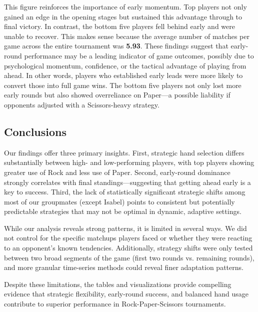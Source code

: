 \documentclass[12pt]{article}
\begin{document}
This figure reinforces the importance of early momentum. Top players not only gained an edge in the opening stages but sustained this advantage through to final victory. In contrast, the bottom five players fell behind early and were unable to recover. This makes sense because the average number of matches per game across the entire tournament was \textbf{5.93}. These findings suggest that early-round performance may be a leading indicator of game outcomes, possibly due to psychological momentum, confidence, or the tactical advantage of playing from ahead. In other words, players who established early leads were more likely to convert those into full game wins. The bottom five players not only lost more early rounds but also showed overreliance on Paper—a possible liability if opponents adjusted with a Scissors-heavy strategy.

\subsection*{Conclusions}

Our findings offer three primary insights. First, strategic hand selection differs substantially between high- and low-performing players, with top players showing greater use of Rock and less use of Paper. Second, early-round dominance strongly correlates with final standings—suggesting that getting ahead early is a key to success. Third, the lack of statistically significant strategic shifts among most of our groupmates (except Isabel) points to consistent but potentially predictable strategies that may not be optimal in dynamic, adaptive settings.

While our analysis reveals strong patterns, it is limited in several ways. We did not control for the specific matchups players faced or whether they were reacting to an opponent’s known tendencies. Additionally, strategy shifts were only tested between two broad segments of the game (first two rounds vs. remaining rounds), and more granular time-series methods could reveal finer adaptation patterns. 

Despite these limitations, the tables and visualizations provide compelling evidence that strategic flexibility, early-round success, and balanced hand usage contribute to superior performance in Rock-Paper-Scissors tournaments.

\end{document}
